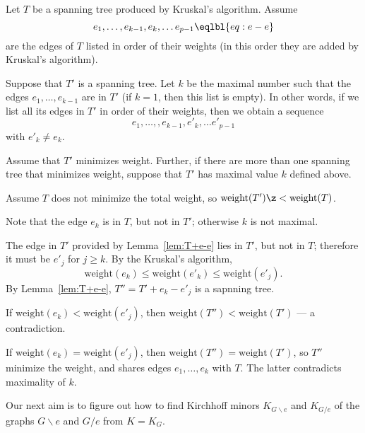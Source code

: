 Let $T$ be a spanning tree produced by Kruskal’s algorithm.
Assume 
\[e_1,\dots,e_{k-1},e_k,\dots e_{p-1}\eqlbl{eq:e-e}\] 
are the edges of $T$ listed in order of their weights
(in this order they are added by Kruskal’s algorithm).

Suppose that $T'$ is a spanning tree.
Let $k$ be the maximal number such that the edges  $e_1,\dots,e_{k-1}$ are in $T'$ (if $k=1$, then this list is empty). 
In other words, if we list all its edges in $T'$ in order of their weights, then 
we obtain a sequence 
\[e_1,\dots,,e_{k-1},e'_k,\dots e'_{p-1}\]
with $e'_k\ne e_k$.

Assume that $T'$ minimizes weight.
Further, if there are more than one spanning tree that minimizes weight, suppose that $T'$ has maximal value $k$ defined above.

Assume $T$ does not minimize the total weight, so $\mathrm{weight}(T')\z< \mathrm{weight}(T)$.

Note that the edge $e_k$ is in $T$, but not in $T'$; otherwise $k$ is not maximal.

The edge in $T'$ provided by Lemma~\ref{lem:T+e-e} lies in $T'$, but not in $T$;
therefore it must be $e'_j$ for $j\ge k$.
By the Kruskal’s algorithm,
\[\mathrm{weight}(e_k)\le \mathrm{weight}(e'_k)\le \mathrm{weight}(e'_j).\]
By Lemma~\ref{lem:T+e-e}, $T''=T'+e_k-e'_j$ is a sapnning tree.

If $\mathrm{weight}(e_k)< \mathrm{weight}(e'_j)$, then $\mathrm{weight}(T'')<\mathrm{weight}(T')$ --- a contradiction.

If $\mathrm{weight}(e_k)=\mathrm{weight}(e'_j)$, then $\mathrm{weight}(T'')=\mathrm{weight}(T')$, so $T''$ minimize the weight, and shares edges $e_1,\dots,e_k$ with $T$.
The latter contradicts maximality of $k$.
\qeds































Our next aim is to figure out how to find Kirchhoff minors $K_{G\backslash e}$ and $K_{G/e}$ of the graphs $G\backslash e$ and $G/e$ from $K=K_G$.




